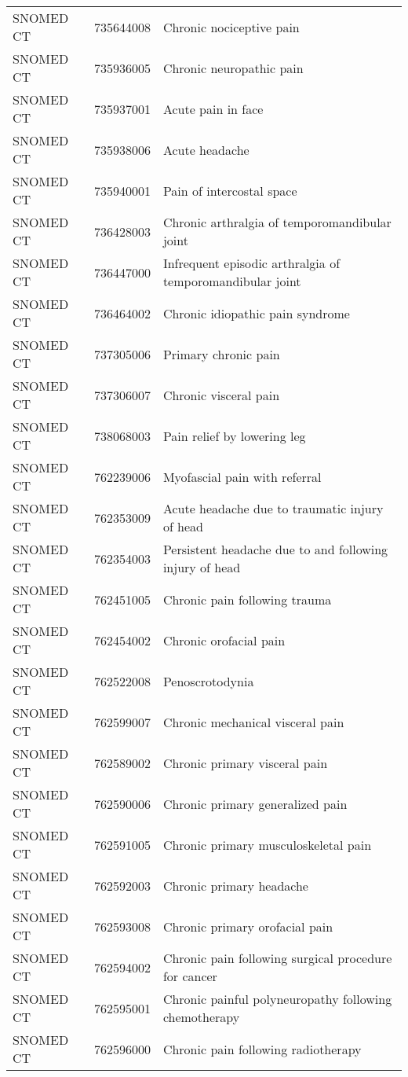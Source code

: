\begin{longtable}{p{}p{}p{}}
  SNOMED CT & 735644008 & Chronic nociceptive pain \\ 
  SNOMED CT & 735936005 & Chronic neuropathic pain \\ 
  SNOMED CT & 735937001 & Acute pain in face \\ 
  SNOMED CT & 735938006 & Acute headache \\ 
  SNOMED CT & 735940001 & Pain of intercostal space \\ 
  SNOMED CT & 736428003 & Chronic arthralgia of temporomandibular joint \\ 
  SNOMED CT & 736447000 & Infrequent episodic arthralgia of temporomandibular joint \\ 
  SNOMED CT & 736464002 & Chronic idiopathic pain syndrome \\ 
  SNOMED CT & 737305006 & Primary chronic pain \\ 
  SNOMED CT & 737306007 & Chronic visceral pain \\ 
  SNOMED CT & 738068003 & Pain relief by lowering leg \\ 
  SNOMED CT & 762239006 & Myofascial pain with referral \\ 
  SNOMED CT & 762353009 & Acute headache due to traumatic injury of head \\ 
  SNOMED CT & 762354003 & Persistent headache due to and following injury of head \\ 
  SNOMED CT & 762451005 & Chronic pain following trauma \\ 
  SNOMED CT & 762454002 & Chronic orofacial pain \\ 
  SNOMED CT & 762522008 & Penoscrotodynia \\ 
  SNOMED CT & 762599007 & Chronic mechanical visceral pain \\ 
  SNOMED CT & 762589002 & Chronic primary visceral pain \\ 
  SNOMED CT & 762590006 & Chronic primary generalized pain \\ 
  SNOMED CT & 762591005 & Chronic primary musculoskeletal pain \\ 
  SNOMED CT & 762592003 & Chronic primary headache \\ 
  SNOMED CT & 762593008 & Chronic primary orofacial pain \\ 
  SNOMED CT & 762594002 & Chronic pain following surgical procedure for cancer \\ 
  SNOMED CT & 762595001 & Chronic painful polyneuropathy following chemotherapy \\ 
  SNOMED CT & 762596000 & Chronic pain following radiotherapy \\ 

\end{longtable}
